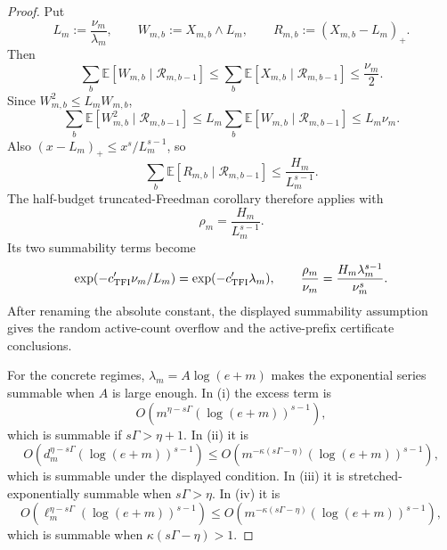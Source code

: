 \documentclass[11pt]{amsart}
\numberwithin{equation}{section}
\theoremstyle{definition}
\theoremstyle{remark}
\newcommand{\Exp}{\mathbb E}
\begin{document}
\begin{proof}
Put
\[
  L_m:=\frac{\nu_m}{\lambda_m},\qquad
  W_{m,b}:=X_{m,b}\wedge L_m,\qquad
  R_{m,b}:=(X_{m,b}-L_m)_+ .
\]
Then
\[
  \sum_b\Exp[W_{m,b}\mid\mathcal R_{m,b-1}]
  \le
  \sum_b\Exp[X_{m,b}\mid\mathcal R_{m,b-1}]
  \le \frac{\nu_m}{2}.
\]
Since \(W_{m,b}^2\le L_m W_{m,b}\),
\[
  \sum_b\Exp[W_{m,b}^2\mid\mathcal R_{m,b-1}]
  \le
  L_m\sum_b\Exp[W_{m,b}\mid\mathcal R_{m,b-1}]
  \le L_m\nu_m .
\]
Also \((x-L_m)_+\le x^s/L_m^{s-1}\), so
\[
  \sum_b\Exp[R_{m,b}\mid\mathcal R_{m,b-1}]
  \le
  \frac{H_m}{L_m^{s-1}} .
\]
The half-budget truncated-Freedman corollary therefore applies with
\[
  \rho_m=\frac{H_m}{L_m^{s-1}} .
\]
Its two summability terms become
\[
  \exp(-c'_{\rm TFI}\nu_m/L_m)=\exp(-c'_{\rm TFI}\lambda_m),
  \qquad
  \frac{\rho_m}{\nu_m}
  =
  \frac{H_m\lambda_m^{s-1}}{\nu_m^s}.
\]
After renaming the absolute constant, the displayed summability assumption
gives the random active-count overflow and the active-prefix certificate
conclusions.

For the concrete regimes, \(\lambda_m=A\log(e+m)\) makes the exponential
series summable when \(A\) is large enough.  In \textup{(i)} the excess term is
\[
  O\!\left(m^{\eta-s\Gamma}(\log(e+m))^{s-1}\right),
\]
which is summable if \(s\Gamma>\eta+1\).  In \textup{(ii)} it is
\[
  O\!\left(d_m^{\eta-s\Gamma}(\log(e+m))^{s-1}\right)
  \le
  O\!\left(m^{-\kappa(s\Gamma-\eta)}
           (\log(e+m))^{s-1}\right),
\]
which is summable under the displayed condition.  In \textup{(iii)} it is
stretched-exponentially summable when \(s\Gamma>\eta\).  In \textup{(iv)} it is
\[
  O\!\left(\ell_m^{\eta-s\Gamma}(\log(e+m))^{s-1}\right)
  \le
  O\!\left(m^{-\kappa(s\Gamma-\eta)}
           (\log(e+m))^{s-1}\right),
\]
which is summable when \(\kappa(s\Gamma-\eta)>1\).
\end{proof}
\end{document}
